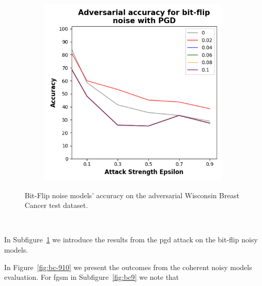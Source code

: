 \begin{figure}[!h]
\begin{subfigure}{0.45\textwidth}
      \includegraphics[width=\linewidth]{figures/evaluation_results/breast-cancer/pqc/figures/bit-flip-pgd.png}
      \label{fig:bc8}
  \end{subfigure}
  \caption{Bit-Flip noise models' accuracy on the adversarial Wisconsin Breast Cancer test dataset.}
  \label{fig:bc-78}
\end{figure} \

In Subfigure~\ref{fig:bc8} we introduce the results from the \ac{pgd}
attack on the bit-flip noisy models. \

In Figure~\ref{fig:bc-910} we present the outcomes from the coherent
noisy models evaluation. For \ac{fgsm} in Subfigure~\ref{fig:bc9}
we note that \

